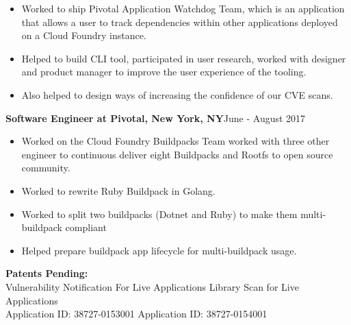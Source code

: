 \documentclass[10pt,a4papaer]{article}
\begin{document}
{\begin{itemize}[noitemsep, topsep=0pt]
\item Worked to ship Pivotal Application Watchdog Team, which is an application that allows a user to track dependencies within other applications deployed on a Cloud Foundry instance. 
\item Helped to build CLI tool, participated in user research, worked with designer and product manager to improve the user experience of the tooling. \item Also helped to design ways of increasing the confidence of our CVE scans.\\
\end{itemize}

{\noindent\textbf{Software Engineer at Pivotal, New York, NY}}{\hfill June - August 2017}
\begin{itemize}[noitemsep, topsep=0pt]
\item Worked on the Cloud Foundry Buildpacks Team worked with three other engineer to continuous deliver eight Buildpacks and Rootfs to open source community. 
\item Worked to rewrite Ruby Buildpack in Golang.
\item Worked to split two buildpacks (Dotnet and Ruby) to make them multi-buildpack compliant
\item Helped prepare buildpack app lifecycle for multi-buildpack usage.\\

\end{itemize}

\setlength{\leftskip}{0pt}

{\noindent\textbf{Patents Pending:}\\}
Vulnerability Notification For Live Applications {\hfill Library Scan for Live Applications}\\
Application ID: 38727-0153001 {\hfill Application ID: 38727-0154001\quad}


}
\end{document}
